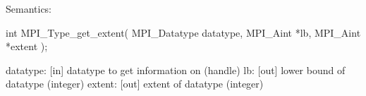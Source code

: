 Semantics:

int MPI_Type_get_extent(
    MPI_Datatype datatype,
    MPI_Aint *lb, MPI_Aint *extent
    );

datatype: [in] datatype to get information on (handle)
lb: [out] lower bound of datatype (integer)
extent: [out] extent of datatype (integer)
